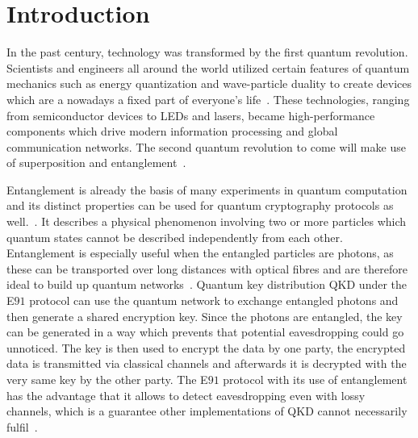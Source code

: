 \chapter{Introduction}

In the past century, technology was transformed by the first quantum revolution. Scientists and engineers all around the world utilized certain features of quantum mechanics such as energy quantization and wave-particle duality to create devices which are a nowadays a fixed part of everyone's life~\cite{aharonovich_solid-state_2016}.
These technologies, ranging from semiconductor devices to LEDs and lasers, became high-performance components which drive modern information processing and global communication networks.
The second quantum revolution to come will make use of superposition and entanglement~\cite{macfarlane_quantum_2003}.

Entanglement is already the basis of many experiments in quantum computation and its distinct properties can be used for quantum cryptography protocols as well.~\cite{zeilinger_light_2017}.
It describes a physical phenomenon involving two or more particles which quantum states cannot be described independently from each other.
Entanglement is especially useful when the entangled particles are photons, as these can be transported over long distances with optical fibres and are therefore ideal to build up quantum networks~\cite{gisin_quantum_2002}.
Quantum key distribution \acs{QKD}  under the E$91$ protocol can use the quantum network to exchange entangled photons and then generate a shared encryption key.
Since the photons are entangled, the key can be generated in a way which prevents that potential eavesdropping could go unnoticed.
The key is then used to encrypt the data by one party, the encrypted data is transmitted via classical channels and afterwards it is decrypted with the very same key by the other party.
The E$91$ protocol with its use of entanglement has the advantage that it allows to detect eavesdropping even with lossy channels, which is a guarantee other implementations of \ac{QKD} cannot necessarily fulfil~\cite{ekert_quantum_1991}.

